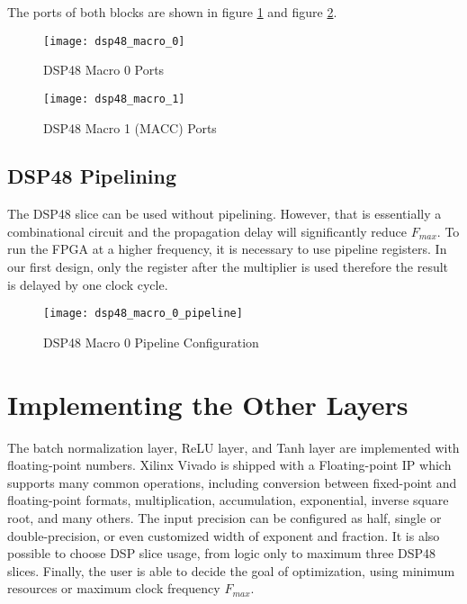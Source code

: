 \begin{itemize}
The ports of both blocks are shown in figure \ref{fig:dsp48_macro_0} and figure \ref{fig:dsp48_macro_1}.

\begin{figure}[h]
  \centering
  \texttt{[image: dsp48\_macro\_0]}
  \caption{DSP48 Macro 0 Ports}
  \label{fig:dsp48_macro_0}
\end{figure}

\begin{figure}[h]
  \centering
  \texttt{[image: dsp48\_macro\_1]}
  \caption{DSP48 Macro 1 (MACC) Ports}
  \label{fig:dsp48_macro_1}
\end{figure}

\subsection{DSP48 Pipelining}

The DSP48 slice can be used without pipelining. However, that is essentially a combinational circuit and
the propagation delay will significantly reduce $F_{max}$. To run the FPGA at a higher frequency, it is
necessary to use pipeline registers. In our first design, only the register after the multiplier is used
therefore the result is delayed by one clock cycle.

\begin{figure}[h]
  \centering
  \texttt{[image: dsp48\_macro\_0\_pipeline]}
  \caption{DSP48 Macro 0 Pipeline Configuration}
  \label{fig:dsp48_macro_0_pipeline}
\end{figure}

\section{Implementing the Other Layers}

The batch normalization layer, ReLU layer, and Tanh layer are implemented with floating-point numbers.
Xilinx Vivado is shipped with a Floating-point IP which supports many common operations, including
conversion between fixed-point and floating-point formats, multiplication, accumulation, exponential,
inverse square root, and many others. The input precision can be configured as half, single or
double-precision, or even customized width of exponent and fraction. It is also possible to choose
DSP slice usage, from logic only to maximum three DSP48 slices. Finally, the user is able to decide
the goal of optimization, using minimum resources or maximum clock frequency $F_{max}$.


\end{itemize}
